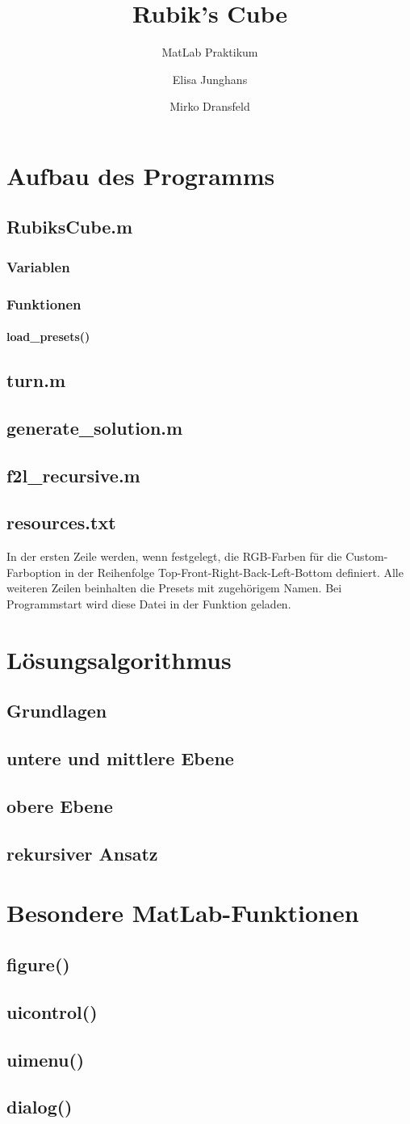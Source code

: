 \documentclass[a4paper,11pt]{scrreprt}
\title{Rubik's Cube}
\subtitle{MatLab Praktikum}
\author{Elisa Junghans\and Mirko Dransfeld}
\date{}
\newcommand{\coderef}[1]{
  \texttt{\nameref{#1}}
}
\newcommand{\chap}[2]{
  \chapter{#1}\label{#2}
}
\renewcommand{\sec}[2]{
  \section{#1}\label{#2}
}
\newcommand{\subsec}[2]{
  \subsection{#1}\label{#2}
}
\newcommand{\subsubsec}[2]{
  \subsubsection{#1}\label{#2}
}
\begin{document}
  \maketitle

  \chap{Aufbau des Programms}{aufbau}

    \sec{RubiksCube.m}{rubikscube}
      \subsec{Variablen}{variablen}

      \subsec{Funktionen}{funktionen}

        \subsubsec{load\_presets()}{loadpresets}

    \sec{turn.m}{turn}

    \sec{generate\_solution.m}{generatesolution}

    \sec{f2l\_recursive.m}{f2lrecursive}

    \sec{resources.txt}{resources}
      In der ersten Zeile werden, wenn festgelegt, die RGB-Farben für die Custom-Farboption in der Reihenfolge Top-Front-Right-Back-Left-Bottom definiert. Alle weiteren Zeilen beinhalten die Presets mit zugehörigem Namen. Bei Programmstart wird diese Datei in der Funktion \coderef{loadpresets} geladen.

  \chap{Lösungsalgorithmus}{algorithm}

    \sec{Grundlagen}{grundlagen}

    \sec{untere und mittlere Ebene}{f2l}

    \sec{obere Ebene}{oben}

    \sec{rekursiver Ansatz}{recursive}

  \chap{Besondere MatLab-Funktionen}{matlab}

    \sec{figure()}{figure}

    \sec{uicontrol()}{uicontrol}

    \sec{uimenu()}{uimenu}

    \sec{dialog()}{dialog}
\end{document}
